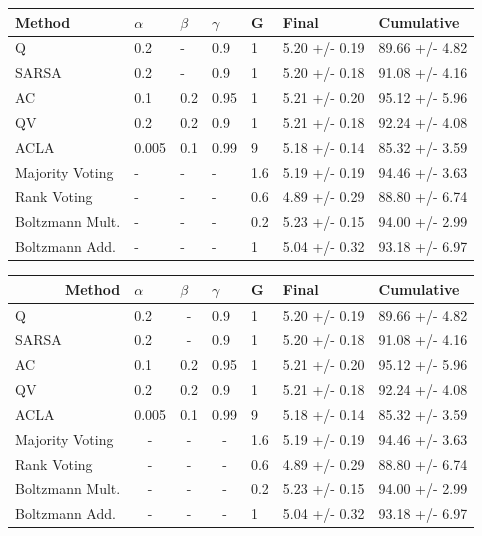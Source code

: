 \begin{longtable}[]{@{}lllllll@{}}
\toprule
Method & \(\alpha\) & \(\beta\) & \(\gamma\) & G & Final &
Cumulative\tabularnewline
\midrule
\endhead
Q & 0.2 & - & 0.9 & 1 & 5.20 +/- 0.19 & 89.66 +/- 4.82\tabularnewline
SARSA & 0.2 & - & 0.9 & 1 & 5.20 +/- 0.18 & 91.08 +/-
4.16\tabularnewline
AC & 0.1 & 0.2 & 0.95 & 1 & 5.21 +/- 0.20 & 95.12 +/-
5.96\tabularnewline
QV & 0.2 & 0.2 & 0.9 & 1 & 5.21 +/- 0.18 & 92.24 +/- 4.08\tabularnewline
ACLA & 0.005 & 0.1 & 0.99 & 9 & 5.18 +/- 0.14 & 85.32 +/-
3.59\tabularnewline
Majority Voting & - & - & - & 1.6 & 5.19 +/- 0.19 & 94.46 +/-
3.63\tabularnewline
Rank Voting & - & - & - & 0.6 & 4.89 +/- 0.29 & 88.80 +/-
6.74\tabularnewline
Boltzmann Mult. & - & - & - & 0.2 & 5.23 +/- 0.15 & 94.00 +/-
2.99\tabularnewline
Boltzmann Add. & - & - & - & 1 & 5.04 +/- 0.32 & 93.18 +/-
6.97\tabularnewline
\bottomrule
\end{longtable}

\begin{table}[]
\begin{tabular}{|l|l|c|l|l|l|l|}
\hline
\multicolumn{1}{|r|}{\textbf{Method}} & $\alpha$               & \multicolumn{1}{l|}{$\beta$} & $\gamma$               & G   & Final         & \textbf{Cumulative} \\ \hline
Q                                     & 0.2                    & -                            & 0.9                    & 1   & 5.20 +/- 0.19 & 89.66 +/- 4.82      \\ \hline
SARSA                                 & 0.2                    & -                            & 0.9                    & 1   & 5.20 +/- 0.18 & 91.08 +/- 4.16      \\ \hline
AC                                    & 0.1                    & 0.2                          & 0.95                   & 1   & 5.21 +/- 0.20 & 95.12 +/- 5.96      \\ \hline
QV                                    & 0.2                    & 0.2                          & 0.9                    & 1   & 5.21 +/- 0.18 & 92.24 +/- 4.08      \\ \hline
ACLA                                  & 0.005                  & 0.1                          & 0.99                   & 9   & 5.18 +/- 0.14 & 85.32 +/- 3.59      \\ \hline
Majority Voting                       & \multicolumn{1}{c|}{-} & -                            & \multicolumn{1}{c|}{-} & 1.6 & 5.19 +/- 0.19 & 94.46 +/- 3.63      \\ \hline
Rank Voting                           & \multicolumn{1}{c|}{-} & -                            & \multicolumn{1}{c|}{-} & 0.6 & 4.89 +/- 0.29 & 88.80 +/- 6.74      \\ \hline
Boltzmann Mult.                       & \multicolumn{1}{c|}{-} & -                            & \multicolumn{1}{c|}{-} & 0.2 & 5.23 +/- 0.15 & 94.00 +/- 2.99      \\ \hline
Boltzmann Add.                        & \multicolumn{1}{c|}{-} & -                            & \multicolumn{1}{c|}{-} & 1   & 5.04 +/- 0.32 & 93.18 +/- 6.97      \\ \hline
\end{tabular}
\end{table}

